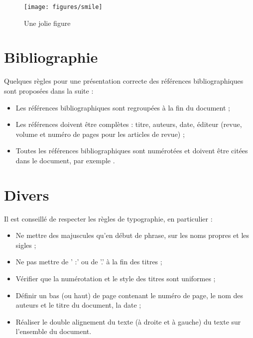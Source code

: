 \begin{figure}
	\begin{center}
		\texttt{[image: figures/smile]}
	\end{center}
	\caption{Une jolie figure}
	\label{fig:smile}
\end{figure}


\vspace{1cm}

\section*{Bibliographie}
Quelques règles pour une présentation correcte des références bibliographiques sont proposées dans la suite :
\begin{itemize}
	\item Les références bibliographiques sont regroupées à la fin du document ;
	\item Les références doivent être complètes : titre, auteurs, date, éditeur (revue, volume et numéro de pages pour les articles de revue) ;
	\item Toutes les références bibliographiques sont numérotées et doivent être citées dans le document, par exemple \cite{Seidemann}.
\end{itemize}

\section*{Divers}
Il est conseillé de respecter les règles de typographie, en particulier :
\begin{itemize}
	\item Ne mettre des majuscules qu’en début de phrase, sur les noms propres et les sigles ;
	\item Ne pas mettre de ’ :’ ou de ’.’ à la fin des titres ;
	\item Vérifier que la numérotation et le style des titres sont uniformes ;
	\item Définir un bas (ou haut) de page contenant le numéro de page, le nom des auteurs et le titre du document, la date ;
	\item Réaliser le double alignement du texte (à droite et à gauche) du texte sur l’ensemble du document.
\end{itemize}
